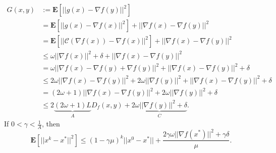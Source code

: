 \documentclass[12pt]{article}
\begin{document}
\begin{equation*}
    \begin{split}
        G(x,y) &:= \mathbf{E}\left[ ||g(x) - \nabla f(y)||^2 \right] \\
                &= \mathbf{E}\left[ ||g(x) - \nabla f(x)||^2 \right] + || \nabla f(x) - \nabla f(y)||^2 \\
                &= \mathbf{E}\left[ ||\mathcal{C}(\nabla f(x)) - \nabla f(x)||^2 \right] + ||\nabla f(x) - \nabla f(y)||^2 \\
                &\leq \omega ||\nabla f(x)||^2 + \delta + || \nabla f(x) - \nabla f(y)||^2 \\
                &= \omega ||\nabla f(x) - \nabla f(y) + \nabla f(y)||^2 + || \nabla f(x) - \nabla f(y)||^2 + \delta \\
                &\leq 2\omega||\nabla f(x) - \nabla f(y)||^2 + 2\omega|| \nabla f(y) ||^2 + || \nabla f(x) - \nabla f(y)||^2 + \delta \\
                &= (2\omega+1)||\nabla f(x) - \nabla f(y)||^2 + 2\omega|| \nabla f(y) ||^2 + \delta \\
                &\leq 2\underbrace{(2\omega+1)L}_{A}D_f(x,y) + \underbrace{2\omega||\nabla f(y)||^2 + \delta}_{C}.
    \end{split}
\end{equation*}
If $0 < \gamma < \frac{1}{A}$, then
\begin{equation*}
    \mathbf{E}\left[ ||x^k - x^*||^2 \right] \leq (1-\gamma \mu)^k ||x^0 - x^* || + \frac{2\gamma\omega|| \nabla f(x^*)||^2 + \gamma\delta}{\mu}.
\end{equation*}
\end{document}
